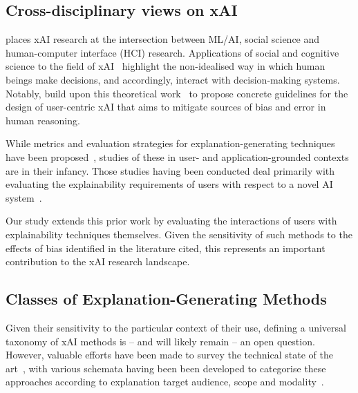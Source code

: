 \documentclass[final,5p,times,twocolumn,hyphens]{elsarticle}
\begin{document}
\subsection{Cross-disciplinary views on xAI}

\citet{miller2019explanation} places xAI research at the intersection between ML/AI, social science and human-computer interface (HCI) research. %
Applications of social and cognitive science to the field of xAI~\cite{de2017people, miller2019explanation, lipton2018mythos, jussupow2021augmenting} highlight the non-idealised way in which human beings make decisions, and accordingly, interact with decision-making systems. Notably, \citet{wang_designing_2019} build upon this theoretical work~\cite{hoffman2017explainingpart1,hoffman2017explainingpart2, klein2018explainingpart3, hoffman2018explainingpart4} to propose concrete guidelines for the design of user-centric xAI that aims to mitigate sources of bias and error in human reasoning.

While metrics and evaluation strategies for explanation-generating techniques have been proposed~\cite{doshi2017towards, HolzingerEtAl:2019:Wiley-Paper, HolzingerEtAl:2020:QualityOfExplanations}, studies of these in user- and application-grounded contexts are in their infancy. Those studies having been conducted deal primarily with evaluating the explainability requirements of users with respect to a novel AI system~\cite{liao2020questioning, cai2019hello}.

Our study extends this prior work by evaluating the interactions of users with explainability techniques themselves. Given the sensitivity of such methods to the effects of bias identified in the literature cited, this represents an important contribution to the xAI research landscape.

\subsection{Classes of Explanation-Generating Methods}
\label{sec:related:classes}

Given their sensitivity to the particular context of their use, defining a universal taxonomy of xAI methods is -- and will likely remain -- an open question. However, valuable efforts have been made to survey the technical state of the art~\cite{tjoa_survey_2020, deshpande2021brief}, with various schemata having been been developed to categorise these approaches according to explanation target audience, scope and modality~\cite{arrieta2020explainable}.
\end{document}
